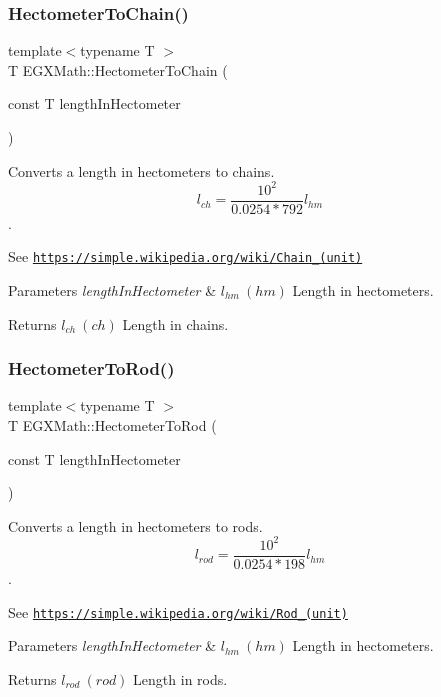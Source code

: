\subsubsection{\texorpdfstring{Hectometer\+To\+Chain()}{HectometerToChain()}}
{\footnotesize\ttfamily template$<$typename T $>$ \\
T E\+G\+X\+Math\+::\+Hectometer\+To\+Chain (\begin{DoxyParamCaption}\item[{const T}]{length\+In\+Hectometer }\end{DoxyParamCaption})}



Converts a length in hectometers to chains. \[ l_{ch}= \frac{10^{2}}{0.0254 * 792} l_{hm} \]. 

See \href{https://simple.wikipedia.org/wiki/Chain_(unit)}{\tt https\+://simple.\+wikipedia.\+org/wiki/\+Chain\+\_\+(unit)} 
\begin{DoxyParams}{Parameters}
{\em length\+In\+Hectometer} & $ l_{hm}\ (hm)$ Length in hectometers. \\
\hline
\end{DoxyParams}
\begin{DoxyReturn}{Returns}
$ l_{ch}\ (ch)$ Length in chains. 
\end{DoxyReturn}
\mbox{\label{group___e_g_x_math-_conversions-_length_conversions-_hectometer-_surveyors_gafdf1df626e4b3c88f88bd3d6d3545e7d}} 
\subsubsection{\texorpdfstring{Hectometer\+To\+Rod()}{HectometerToRod()}}
{\footnotesize\ttfamily template$<$typename T $>$ \\
T E\+G\+X\+Math\+::\+Hectometer\+To\+Rod (\begin{DoxyParamCaption}\item[{const T}]{length\+In\+Hectometer }\end{DoxyParamCaption})}



Converts a length in hectometers to rods. \[ l_{rod}= \frac{10^{2}}{0.0254 * 198} l_{hm} \]. 

See \href{https://simple.wikipedia.org/wiki/Rod_(unit)}{\tt https\+://simple.\+wikipedia.\+org/wiki/\+Rod\+\_\+(unit)} 
\begin{DoxyParams}{Parameters}
{\em length\+In\+Hectometer} & $ l_{hm}\ (hm)$ Length in hectometers. \\
\hline
\end{DoxyParams}
\begin{DoxyReturn}{Returns}
$ l_{rod}\ (rod)$ Length in rods. 
\end{DoxyReturn}
